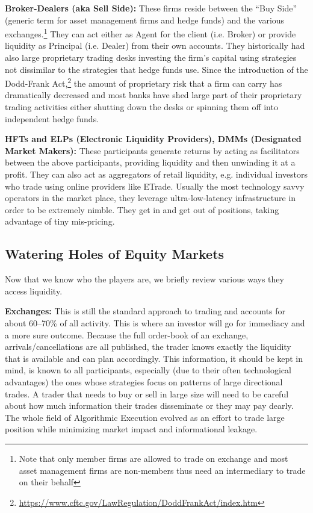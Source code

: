 \noindent\textbf{Broker-Dealers (aka Sell Side):} These firms reside between the ``Buy Side'' (generic term for asset management firms and hedge funds) and the various exchanges.\footnote{Note that only member firms are allowed to trade on exchange and most asset management firms are non-members thus need an intermediary to trade on their behalf} They can act either as Agent for the client (i.e. Broker) or provide liquidity as Principal (i.e. Dealer) from their own accounts. They historically had  also large proprietary trading desks investing the firm's capital using strategies not dissimilar to the strategies that hedge funds use. Since the introduction of the Dodd-Frank Act,\footnote{\url{https://www.cftc.gov/LawRegulation/DoddFrankAct/index.htm}} the amount of proprietary risk that a firm can carry has dramatically decreased and most banks have shed large part of their proprietary trading activities either shutting down the desks or spinning them off into independent hedge funds. \twomedskip


\noindent\textbf{HFTs and ELPs (Electronic Liquidity Providers), DMMs (Designated Market Makers):} These participants generate returns by acting as facilitators between the above participants, providing liquidity and then unwinding it at a profit. They can also act as aggregators of retail liquidity, e.g. individual investors who trade using online providers like ETrade. Usually the most technology savvy operators in the market place, they leverage ultra-low-latency infrastructure in order to be extremely nimble. They get in and get out of positions, taking advantage of tiny mis-pricing. 



\subsection{Watering Holes of Equity Markets}

Now that we know who the players are, we briefly review various ways they access liquidity. \twomedskip

\noindent\textbf{Exchanges:} This is still the standard approach to trading and accounts for about 60--70\% of all activity. This is where an investor will go for immediacy and a more sure outcome. Because the full order-book of an exchange, arrivals/cancellations are all published, the trader knows exactly the liquidity that is available and can plan accordingly. This information, it should be kept in mind, is known to all participants, especially (due to their often technological advantages) the ones whose strategies focus on patterns of large directional trades. A trader that needs to buy or sell in large size will need to be careful about how much information their trades disseminate or they may pay dearly. The whole field of Algorithmic Execution evolved as an effort to trade large position while minimizing market impact and informational leakage.

